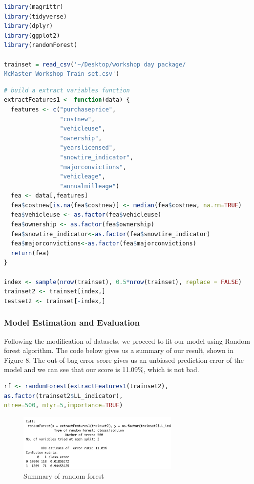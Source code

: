 \documentclass[12pt]{article} %
\theoremstyle{definition}
\begin{document}
\begin{lstlisting}[language=R,xleftmargin=.1\textwidth]
library(magrittr)
library(tidyverse)
library(dplyr)
library(ggplot2)
library(randomForest)

trainset = read_csv('~/Desktop/workshop day package/
McMaster Workshop Train set.csv')
\end{lstlisting}

\begin{lstlisting}[language=R,xleftmargin=.1\textwidth]
# build a extract variables function
extractFeatures1 <- function(data) {
  features <- c("purchaseprice",
                "costnew",
                "vehicleuse",
                "ownership",
                "yearslicensed",
                "snowtire_indicator",
                "majorconvictions",
                "vehicleage",
                "annualmilleage")
  fea <- data[,features]
  fea$costnew[is.na(fea$costnew)] <- median(fea$costnew, na.rm=TRUE)
  fea$vehicleuse <- as.factor(fea$vehicleuse)
  fea$ownership <- as.factor(fea$ownership)
  fea$snowtire_indicator<-as.factor(fea$snowtire_indicator)
  fea$majorconvictions<-as.factor(fea$majorconvictions)
  return(fea)
}

index <- sample(nrow(trainset), 0.5*nrow(trainset), replace = FALSE)
trainset2 <- trainset[index,]
testset2 <- trainset[-index,]
\end{lstlisting}

\newpage
\subsubsection{Model Estimation and Evaluation}
Following the modification of datasets, we proceed to fit our model using Random forest algorithm. The code below gives us a summary of our result, shown in Figure 8. The out-of-bag error score gives us an unbiased prediction error of the model and we can see that our score is 11.09\%, which is not bad.

\begin{lstlisting}[language=R,xleftmargin=.1\textwidth]
rf <- randomForest(extractFeatures1(trainset2),
as.factor(trainset2$LL_indicator), 
ntree=500, mtyr=5,importance=TRUE)
\end{lstlisting}

\begin{figure}[H]
    \centering
    \includegraphics[width=8cm]{RandomForest/summary.png}
    \caption{Summary of random forest}
    \label{fig:my_label}
\end{figure}
\end{document}
